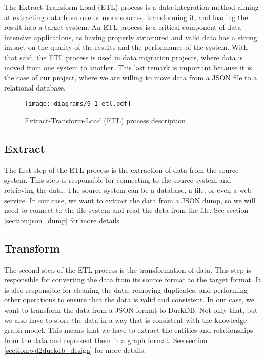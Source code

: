 The Extract-Transform-Load (ETL) process is a data integration method aiming at extracting data from one or more sources, transforming it, and loading the result into a target system. An ETL process is a critical component of data-intensive applications, as having properly structured and valid data has a strong impact on the quality of the results and the performance of the system. With that said, the ETL process is used in data migration projects, where data is moved from one system to another. This last remark is important because it is the case of our project, where we are willing to move data from a JSON file to a relational database.

\begin{figure}[ht]
    \centering
    \texttt{[image: diagrams/9-1\_etl.pdf]}
    \caption{Extract-Transform-Load (ETL) process description}
\end{figure}

\subsection{Extract}

The first step of the ETL process is the extraction of data from the source system. This step is responsible for connecting to the source system and retrieving the data. The source system can be a database, a file, or even a web service. In our case, we want to extract the data from a JSON dump, so we will need to connect to the file system and read the data from the file. See section \ref{section:json_dump} for more details.

\subsection{Transform}

The second step of the ETL process is the transformation of data. This step is responsible for converting the data from its source format to the target format. It is also responsible for cleaning the data, removing duplicates, and performing other operations to ensure that the data is valid and consistent. In our case, we want to transform the data from a JSON format to DuckDB. Not only that, but we also have to store the data in a way that is consistent with the knowledge graph model. This means that we have to extract the entities and relationships from the data and represent them in a graph format. See section \ref{section:wd2duckdb_design} for more details.

